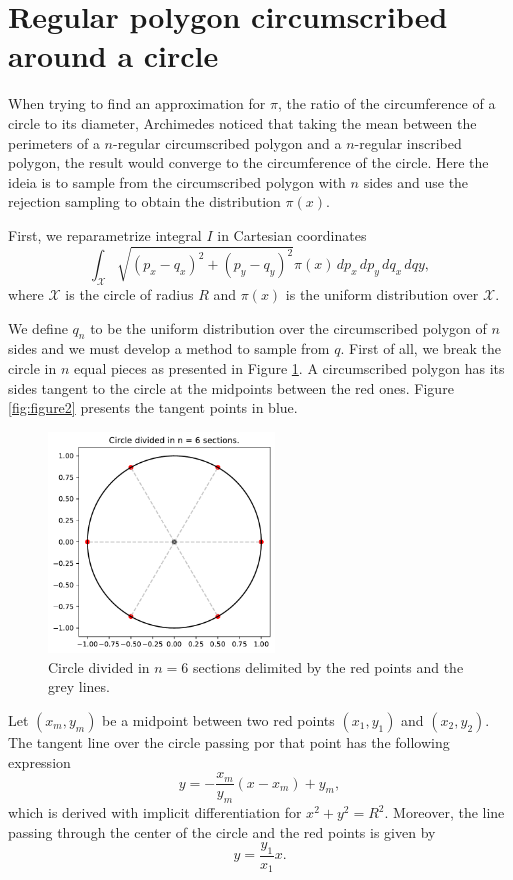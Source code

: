 \documentclass[a4paper,10pt, notitlepage]{report}
\begin{document}
\section*{Regular polygon circumscribed around a circle}

When trying to find an approximation for $\pi$, the ratio of the circumference
of a circle to its diameter, Archimedes noticed that taking the mean between
the perimeters of a $n$-regular circumscribed polygon and a $n$-regular
inscribed polygon, the result would converge to the circumference of the
circle. Here the ideia is to sample from the circumscribed polygon with $n$
sides and use the rejection sampling to obtain the distribution $\pi(x)$. 

First, we reparametrize integral $I$ in Cartesian coordinates 
$$
\int_{\mathcal{X}} \sqrt{(p_x - q_x)^2 + (p_y - q_y)^2} \pi(x) \, dp_x\, dp_y\, dq_x\, dqy, 
$$
where $\mathcal{X}$ is the circle of radius $R$ and $\pi(x)$ is the uniform
distribution over $\mathcal{X}$. 

We define $q_n$ to be the uniform distribution over the circumscribed polygon
of $n$ sides and we must develop a method to sample from $q$. First of all, we
break the circle in $n$ equal pieces as presented in Figure \ref{fig:figure1}.
A circumscribed polygon has its sides tangent to the circle at the midpoints
between the red ones. Figure \ref{fig:figure2} presents the tangent points in
blue. 

\begin{figure}[htpb]
    \centering
    \includegraphics[width=6cm]{images/figure1.pdf}
    \caption{\label{fig:figure1}Circle divided in $n=6$ sections delimited by
    the red points and the grey lines.}
\end{figure}

Let $(x_m, y_m)$ be a midpoint between two red points $(x_1, y_1)$ and
$(x_2, y_2)$. The tangent line over the circle passing por that point has the
following expression
$$
y = -\frac{x_m}{y_m}(x - x_m) + y_m,
$$
which is derived with implicit differentiation for $x^2 + y^2 = R^2$.
Moreover, the line passing through the center of the circle and the red points
is given by
$$
y = \frac{y_1}{x_1}x.
$$
\end{document}
